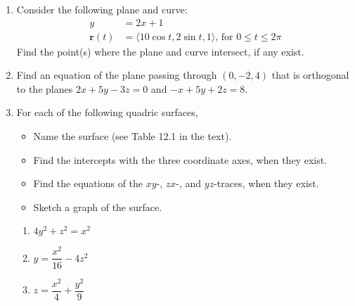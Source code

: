 \documentclass[%
]{article}
\newcommand{\vect}[1]{\mathbf{#1}}
\begin{document}
\begin{enumerate}
\item %
Consider the following plane and curve:
\begin{align*}
y &= 2x+1 \\
\vect r(t) &= \langle 10\cos t,2\sin t, 1 \rangle\text{, for $0\leq t\leq 2\pi$}
\end{align*}  
Find the point(s) where the plane and curve intersect, if any exist.

\item %
Find an equation of the plane passing through $(0,-2,4)$ that is orthogonal to the planes $2x+5y-3z=0$ and $-x+5y+2z=8$.

\item For each of the following quadric surfaces,
\begin{itemize}
	\item Name the surface (see Table 12.1 in the text).
	\item Find the intercepts with the three coordinate axes, when they exist.
	\item Find the equations of the $xy$-, $zx$-, and $yz$-traces, when they exist.
	\item Sketch a graph of the surface.
\end{itemize} 
\begin{enumerate}
	\item %
	$4y^2+z^2=x^2$ 
	\item %
	$y=\dfrac{x^2}{16}-4z^2$
	\item %
	$z=\dfrac{x^2}{4}+\dfrac{y^2}{9}$
\end{enumerate}


\end{enumerate}
\end{document}
